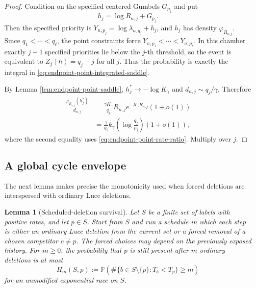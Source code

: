 \documentclass[11pt]{article}
\newtheorem{lemma}[theorem]{Lemma}
\theoremstyle{remark}
\newcommand{\Pp}{\mathbb P}
\begin{document}
\begin{proof}
Condition on the specified centered Gumbels $G_{p_j}$ and put
\[
        h_j=\log R_{n,j}+G_{p_j}.
\]
Then the specified priority is
$Y_{n,p_j}=\log\lambda_{n,q_j}+h_j$, and $h_j$ has density
$\varphi_{R_{n,j}}$.  Since $q_1<\cdots<q_\ell$, the point constraints force
$Y_{n,p_1}<\cdots<Y_{n,p_\ell}$.  In this chamber exactly $j-1$ specified
priorities lie below the $j$-th threshold, so the event is equivalent to
$Z_j(h)=q_j-j$ for all $j$.  Thus the probability is exactly the integral in
\eqref{eq:endpoint-point-integrated-saddle}.

By Lemma \ref{lem:endpoint-point-saddle},
$h_j^*\to-\log K_\gamma$ and $d_{n,j}\sim q_j/\gamma$.  Therefore
\[
\begin{aligned}
\frac{\varphi_{R_{n,j}}(h_j^*)}{d_{n,j}}
&=\frac{\gamma K_\gamma}{q_j}
R_{n,j}e^{-K_\gamma R_{n,j}}(1+o(1))\\
&=\frac1{q_j}k_\gamma\!\left(\log\frac{q_j}{p_j}\right)(1+o(1)),
\end{aligned}
\]
where the second equality uses
\eqref{eq:endpoint-point-rate-ratio}.  Multiply over $j$.
\end{proof}

\subsection{A global cycle envelope}

The next lemma makes precise the monotonicity used when forced deletions are
interspersed with ordinary Luce deletions.

\begin{lemma}[Scheduled-deletion survival]
\label{lem:scheduled-deletion-survival}
Let $S$ be a finite set of labels with positive rates, and let $p\in S$.  Start
from $S$ and run a schedule in which each step is either an ordinary Luce
deletion from the current set or a forced removal of a chosen competitor
$c\ne p$.  The forced choices may depend on the previously exposed history.
For $m\ge0$, the probability that $p$ is still present after $m$ ordinary
deletions is at most
\[
        H_m(S,p):=
        \Pp\left(\#\{b\in S\setminus\{p\}:T_b<T_p\}\ge m\right)
\tag{10.35}\label{eq:scheduled-survival-function}
\]
for an unmodified exponential race on $S$.
\end{lemma}
\end{document}
